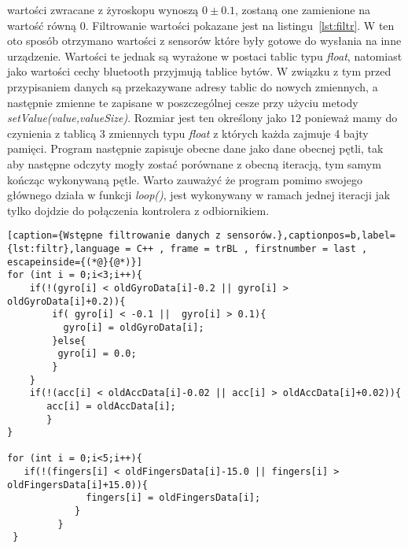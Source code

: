 wartości zwracane z żyroskopu wynoszą $0\pm 0.1$, zostaną one zamienione na wartość równą $0$. Filtrowanie wartości pokazane jest na listingu~\ref{lst:filtr}. W ten oto sposób otrzymano wartości z sensorów które były gotowe do wysłania na inne urządzenie. Wartości te jednak są wyrażone w postaci tablic typu \textit{float}, natomiast jako wartości cechy bluetooth przyjmują tablice bytów. W związku z tym przed przypisaniem danych są przekazywane adresy tablic do nowych zmiennych, a następnie zmienne te zapisane w poszczególnej cesze przy użyciu metody \textit{setValue(value,valueSize)}. Rozmiar jest ten określony jako $12$ ponieważ mamy do czynienia z tablicą 3 zmiennych typu \textit{float} z których każda zajmuje 4 bajty pamięci. Program następnie zapisuje obecne dane jako dane obecnej pętli, tak aby następne odczyty mogły zostać porównane z obecną iteracją, tym samym kończąc wykonywaną pętle. Warto zauważyć że program pomimo swojego głównego działa w funkcji \textit{loop()}, jest wykonywany w ramach jednej iteracji jak tylko dojdzie do połączenia kontrolera z odbiornikiem.
\begin{lstlisting}[caption={Wstępne filtrowanie danych z sensorów.},captionpos=b,label={lst:filtr},language = C++ , frame = trBL , firstnumber = last , escapeinside={(*@}{@*)}]
for (int i = 0;i<3;i++){
	if(!(gyro[i] < oldGyroData[i]-0.2 || gyro[i] > oldGyroData[i]+0.2)){
		if( gyro[i] < -0.1 ||  gyro[i] > 0.1){              
	      gyro[i] = oldGyroData[i];
	    }else{
	     gyro[i] = 0.0;
	    }
	}	            
	if(!(acc[i] < oldAccData[i]-0.02 || acc[i] > oldAccData[i]+0.02)){
	   acc[i] = oldAccData[i];
	   }
}

for (int i = 0;i<5;i++){
   if(!(fingers[i] < oldFingersData[i]-15.0 || fingers[i] > oldFingersData[i]+15.0)){
              fingers[i] = oldFingersData[i];
            }
         }         
 }
\end{lstlisting}

